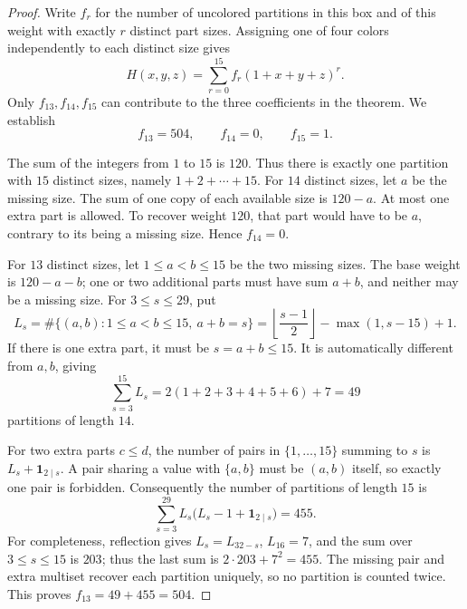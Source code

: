 \documentclass[10pt]{article}
\begin{document}
\begin{proof}
Write \(f_r\) for the number of uncolored partitions in this box and of
this weight with exactly \(r\) distinct part sizes. Assigning one of four
colors independently to each distinct size gives
\begin{equation}\label{H}
 H(x,y,z)=\sum_{r=0}^{15} f_r(1+x+y+z)^r.
\end{equation}
Only \(f_{13},f_{14},f_{15}\) can contribute to the three coefficients
in the theorem. We establish
\begin{equation}\label{f}
 f_{13}=504,\qquad f_{14}=0,\qquad f_{15}=1.
\end{equation}

The sum of the integers from \(1\) to \(15\) is \(120\). Thus there is
exactly one partition with \(15\) distinct sizes, namely
\(1+2+\cdots+15\).
For \(14\) distinct sizes, let \(a\) be the missing size.
The sum of one copy of each available size is \(120-a\).
At most one extra part is allowed. To recover weight \(120\), that part
would have to be \(a\), contrary to its being a missing size. Hence
\(f_{14}=0\).

For \(13\) distinct sizes, let \(1\leq a<b\leq15\) be the two missing
sizes. The base weight is \(120-a-b\); one or two additional parts
must have sum \(a+b\), and neither may be a missing size.
For \(3\leq s\leq29\), put
\[
 L_s=\#\{(a,b):1\leq a<b\leq15,\ a+b=s\}
 =\left\lfloor\frac{s-1}{2}\right\rfloor-\max(1,s-15)+1.
\]
If there is one extra part, it must be \(s=a+b\leq15\).
It is automatically different from \(a,b\), giving
\[
 \sum_{s=3}^{15}L_s
 =2(1+2+3+4+5+6)+7=49
\]
partitions of length \(14\).

For two extra parts \(c\leq d\), the number of pairs in
\(\{1,\ldots,15\}\) summing to \(s\) is
\(L_s+\mathbf 1_{2\mid s}\). A pair sharing a value with
\(\{a,b\}\) must be \((a,b)\) itself, so exactly one pair is forbidden.
Consequently the number of partitions of length \(15\) is
\[
 \sum_{s=3}^{29}L_s\bigl(L_s-1+\mathbf 1_{2\mid s}\bigr)=455.
\]
For completeness, reflection gives \(L_s=L_{32-s}\), \(L_{16}=7\),
and the sum over \(3\leq s\leq15\) is \(203\); thus the last
sum is \(2\cdot203+7^2=455\).
The missing pair and extra multiset recover each partition uniquely,
so no partition is counted twice. This proves \(f_{13}=49+455=504\).


\end{proof}
\end{document}
